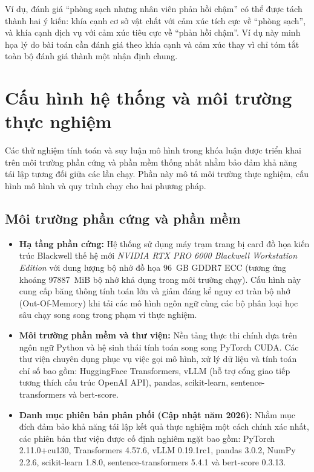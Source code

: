 Ví dụ, đánh giá ``phòng sạch nhưng nhân viên phản hồi chậm'' có thể được tách thành hai ý kiến: khía cạnh cơ sở vật chất với cảm xúc tích cực về ``phòng sạch'', và khía cạnh dịch vụ với cảm xúc tiêu cực về ``phản hồi chậm''. Ví dụ này minh họa lý do bài toán cần đánh giá theo khía cạnh và cảm xúc thay vì chỉ tóm tắt toàn bộ đánh giá thành một nhận định chung.

\section{Cấu hình hệ thống và môi trường thực nghiệm}
\label{subsec:experimental-environment}

Các thử nghiệm tính toán và suy luận mô hình trong khóa luận được triển khai trên môi trường phần cứng và phần mềm thống nhất nhằm bảo đảm khả năng tái lập tương đối giữa các lần chạy. Phần này mô tả môi trường thực nghiệm, cấu hình mô hình và quy trình chạy cho hai phương pháp.

\subsection{Môi trường phần cứng và phần mềm}

\begin{itemize}[leftmargin=0.6cm]
    \item \textbf{Hạ tầng phần cứng:} Hệ thống sử dụng máy trạm trang bị card đồ họa kiến trúc Blackwell thế hệ mới \textit{NVIDIA RTX PRO 6000 Blackwell Workstation Edition} với dung lượng bộ nhớ đồ họa 96~GB GDDR7 ECC (tương ứng khoảng \num{97887}~MiB bộ nhớ khả dụng trong môi trường chạy). Cấu hình này cung cấp băng thông tính toán lớn và giảm đáng kể nguy cơ tràn bộ nhớ (Out-Of-Memory) khi tải các mô hình ngôn ngữ cùng các bộ phân loại học sâu chạy song song trong phạm vi thực nghiệm.

    \item \textbf{Môi trường phần mềm và thư viện:} Nền tảng thực thi chính dựa trên ngôn ngữ Python và hệ sinh thái tính toán song song PyTorch CUDA. Các thư viện chuyên dụng phục vụ việc gọi mô hình, xử lý dữ liệu và tính toán chỉ số bao gồm: HuggingFace Transformers, vLLM (hỗ trợ cổng giao tiếp tương thích cấu trúc OpenAI API), pandas, scikit-learn, sentence-transformers và bert-score.

    \item \textbf{Danh mục phiên bản phân phối (Cập nhật năm 2026):} Nhằm mục đích đảm bảo khả năng tái lập kết quả thực nghiệm một cách chính xác nhất, các phiên bản thư viện được cố định nghiêm ngặt bao gồm: PyTorch 2.11.0+cu130, Transformers 4.57.6, vLLM 0.19.1rc1, pandas 3.0.2, NumPy 2.2.6, scikit-learn 1.8.0, sentence-transformers 5.4.1 và bert-score 0.3.13.
\end{itemize}

